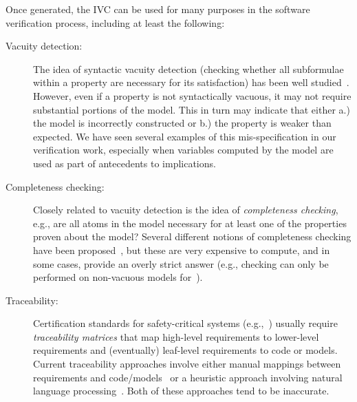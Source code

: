 Once generated, the IVC can be used for many purposes in the software verification process, including at least the following:
\begin{description}
    \item[Vacuity detection:] The idea of syntactic vacuity detection (checking whether all subformulae within a property are necessary for its satisfaction) has been well studied~\cite{Kupferman03:Vacuity}.   However, even if a property is not syntactically vacuous, it may not require substantial portions of the model.  This in turn may indicate that either a.) the model is incorrectly constructed or b.) the property is weaker than expected.  We have seen several examples of this mis-specification in our verification work, especially when variables computed by the model are used as part of antecedents to implications.
    \item[Completeness checking:] Closely related to vacuity detection is the idea of {\em completeness checking}, e.g., are all atoms in the model necessary for at least one of the properties proven about the model?  Several different notions of completeness checking have been proposed~\cite{chockler_coverage_2003, kupferman_theory_2008}, but these are very expensive to compute, and in some cases, provide an overly strict answer (e.g., checking can only be performed on non-vacuous models for~\cite{kupferman_theory_2008}).         
    \item[Traceability:] Certification standards for safety-critical systems (e.g.,~\cite{DO178C, MOD:00-55}) usually require {\em traceability matrices} that map high-level requirements to lower-level requirements and (eventually) leaf-level requirements to code or models.  Current traceability approaches involve either manual mappings between requirements and code/models~\cite{SimulinkTraceability} or a heuristic approach involving natural language processing~\cite{Keenan12:Tracelab}.  Both of these approaches tend to be inaccurate.  

\end{description}
